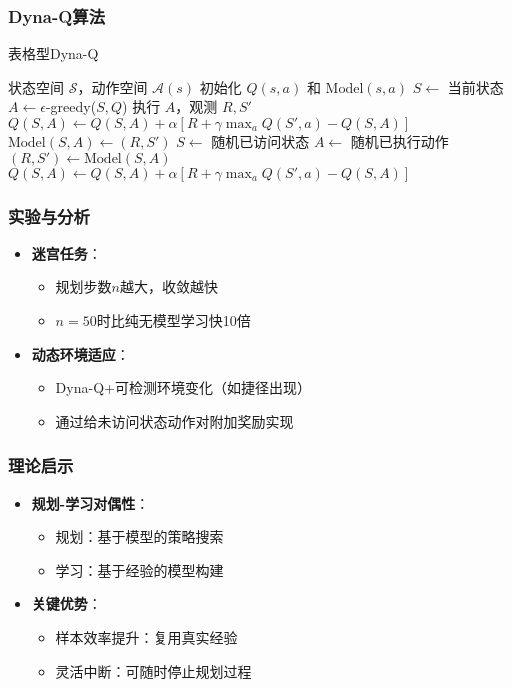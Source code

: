 \subsubsection{Dyna-Q算法}
\begin{algorithm}[H]
\caption{表格型Dyna-Q}
\begin{algorithmic}[1]
\REQUIRE 状态空间 $\mathcal{S}$，动作空间 $\mathcal{A}(s)$
    \STATE 初始化 $Q(s,a)$ 和 $\text{Model}(s,a)$
\ENDFOR
{}
    \STATE $S \leftarrow$ 当前状态
    \STATE $A \leftarrow \epsilon$-greedy($S,Q$)
    \STATE 执行 $A$，观测 $R,S'$
    \STATE $Q(S,A) \leftarrow Q(S,A) + \alpha[R+\gamma\max_a Q(S',a)-Q(S,A)]$
    \STATE $\text{Model}(S,A) \leftarrow (R,S')$
        \STATE $S \leftarrow$ 随机已访问状态
        \STATE $A \leftarrow$ 随机已执行动作
        \STATE $(R,S') \leftarrow \text{Model}(S,A)$
        \STATE $Q(S,A) \leftarrow Q(S,A) + \alpha[R+\gamma\max_a Q(S',a)-Q(S,A)]$
    \ENDFOR
\ENDWHILE
\end{algorithmic}
\end{algorithm}


\subsubsection{实验与分析}
\begin{itemize}
    \item \textbf{迷宫任务}：
        \begin{itemize}
            \item 规划步数$n$越大，收敛越快
            \item $n=50$时比纯无模型学习快10倍
        \end{itemize}
    \item \textbf{动态环境适应}：
        \begin{itemize}
            \item Dyna-Q+可检测环境变化（如捷径出现）
            \item 通过给未访问状态动作对附加奖励实现
        \end{itemize}
\end{itemize}

\subsubsection{理论启示}
\begin{itemize}
    \item \textbf{规划-学习对偶性}：
        \begin{itemize}
            \item 规划：基于模型的策略搜索
            \item 学习：基于经验的模型构建
        \end{itemize}
    \item \textbf{关键优势}：
        \begin{itemize}
            \item 样本效率提升：复用真实经验
            \item 灵活中断：可随时停止规划过程
        \end{itemize}
\end{itemize}
